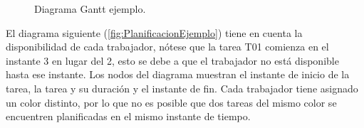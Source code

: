 \begin{figure}[h]
    \begin{center}
    \end{center}
    \caption{Diagrama Gantt ejemplo.}
    \label{fig:ExampleGantt}
\end{figure}

El diagrama siguiente (\ref{fig:PlanificacionEjemplo}) tiene en cuenta la disponibilidad de cada trabajador,
nótese que la tarea T01 comienza en el instante 3 en lugar del 2,
esto se debe a que el trabajador no está disponible hasta ese instante.
Los nodos del diagrama muestran el instante de inicio de la tarea,
la tarea y su duración y el instante de fin.
Cada trabajador tiene asignado un color distinto,
por lo que no es posible que dos tareas del mismo color
se encuentren planificadas en el mismo instante de tiempo.

